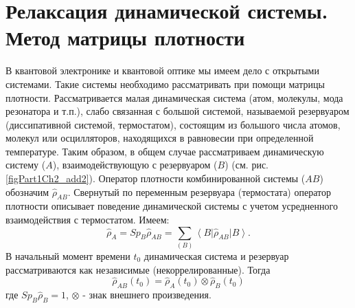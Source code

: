 \section{Релаксация динамической системы. Метод матрицы плотности}
В квантовой электронике и квантовой оптике мы имеем дело с открытыми
системами. Такие системы необходимо рассматривать при помощи
матрицы плотности. Рассматривается малая динамическая система
(атом, молекулы, мода резонатора и т.п.), слабо связанная с
большой системой, называемой резервуаром (диссипативной
системой, термостатом), состоящим из большого числа атомов,
молекул или осцилляторов, находящихся в равновесии при
определенной температуре. Таким образом, в общем случае
рассматриваем динамическую систему ($A$), взаимодействующую с
резервуаром ($B$) (см. рис. \ref{figPart1Ch2_add2}). Оператор
плотности комбинированной системы ($AB$) обозначим $\hat{\rho}_{AB}$.
Свернутый по переменным резервуара (термостата) оператор плотности
описывает поведение динамической системы с учетом усредненного
взаимодействия с термостатом. Имеем: 
\begin{equation}
\hat{\rho}_{A} = Sp_{B} \hat{\rho}_{AB} = 
\sum_{\left(B\right)}
\left<B\right|\hat{\rho}_{AB}\left|B\right>.
\end{equation}
В начальный момент времени $t_0$ динамическая система и резервуар
рассматриваются как независимые (некоррелированные). Тогда 
\begin{equation}
\hat{\rho}_{AB}\left(t_0\right) = 
\hat{\rho}_{A}\left(t_0\right)
\otimes
\hat{\rho}_{B}\left(t_0\right)
\end{equation}
где  $Sp_B \hat{\rho}_{B} = 1$, $\otimes$ - знак внешнего
произведения. 




